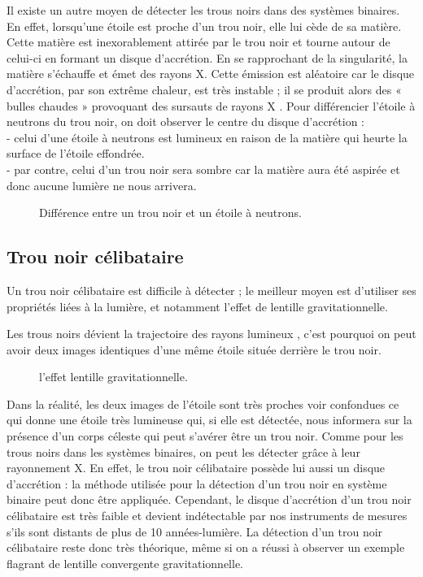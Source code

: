 	
	Il existe un autre moyen de détecter les trous noirs dans des systèmes binaires. En effet, lorsqu’une étoile est proche d’un trou noir, elle lui cède de sa matière. Cette matière est inexorablement attirée par le trou noir et tourne autour de celui-ci en formant un disque d'accrétion. En se rapprochant de la singularité, la matière s’échauffe et émet des rayons X. Cette émission est aléatoire car le disque d’accrétion, par son extrême chaleur, est très instable ; il se produit alors des « bulles chaudes » provoquant des sursauts de rayons X \cite{5}.
	Pour différencier l’étoile à neutrons du trou noir, on doit observer le centre du disque d’accrétion :\\
	- celui d’une étoile à neutrons est lumineux en raison de la matière	
	qui heurte la surface de l’étoile effondrée.\\
	- par contre, celui d’un trou noir sera sombre car la matière aura été	
	aspirée et donc aucune lumière ne nous arrivera.
	\begin{figure}[H]
		
	
	\begin{center}
		
	\end{center}
	\caption{Différence entre un trou noir et un étoile à neutrons.} 
\end{figure}
	
	\subsection{ Trou noir célibataire }
	Un trou noir célibataire est difficile à détecter ; le meilleur moyen est d’utiliser ses propriétés liées à la lumière, et notamment l'effet de lentille gravitationnelle.
	
	Les trous noirs dévient la trajectoire des rayons lumineux , c'est pourquoi on peut avoir deux images identiques d'une même étoile située derrière le trou noir.\\
	\begin{figure}[H]
	\begin{center}
		\centering
			
	\end{center}
\caption{l'effet lentille gravitationnelle.}
\end{figure}
	
	Dans la réalité, les deux images de l’étoile sont très proches voir confondues ce qui donne une étoile très lumineuse qui, si elle est détectée, nous informera sur la présence d’un corps céleste qui peut s’avérer être un trou noir.
	Comme pour les trous noirs dans les systèmes binaires, on peut les détecter grâce à leur rayonnement X. En effet, le trou noir célibataire possède lui aussi un disque d’accrétion : la méthode utilisée pour la détection d’un trou noir en système binaire peut donc être appliquée. Cependant, le disque d’accrétion d’un trou noir célibataire est très faible et devient indétectable par nos instruments de mesures s'ils sont distants de plus de 10 années-lumière.
	La détection d’un trou noir célibataire reste donc très théorique, même si on a réussi à observer un exemple flagrant de lentille convergente gravitationnelle.
	
